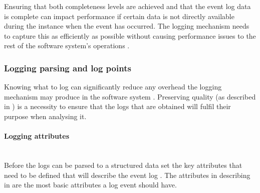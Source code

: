 Ensuring that both completeness levels are achieved and that the event log data is complete can impact performance if certain data is not directly available during the instance when the event has occurred. The logging mechanism needs to capture this as efficiently as possible without causing performance issues to the rest of the software system's operations \cite{Zhu2015, Zhu2019}. 

\subsubsection{Logging parsing and log points}\label{sec:ch1_loggignPoints}
Knowing what to log can significantly reduce any overhead the logging mechanism may produce in the software system \cite{Jia2018, Pecchia2015}. Preserving quality (as described in ) is a necessity to ensure that the logs that are obtained will fulfil their purpose when analysing it.

\paragraph{Logging attributes}\leavevmode\\
Before the logs can be parsed to a structured data set the key attributes that need to be defined that will describe the event log \cite{Bekeneva2020}. The attributes in describing in  are the most basic attributes a log event should have. 


